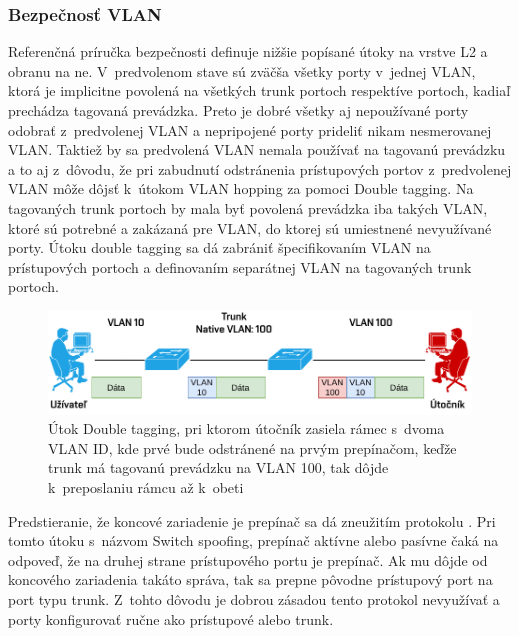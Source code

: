\subsubsection{Bezpečnosť VLAN}
Referenčná príručka bezpečnosti \cite{uYLsMtQInofenpV3} definuje nižšie popísané útoky na vrstve L2 a obranu na ne. V~predvolenom stave sú zväčša všetky porty v~jednej VLAN, ktorá je implicitne povolená na všetkých trunk portoch respektíve portoch, kadiaľ prechádza tagovaná prevádzka. Preto je dobré všetky aj nepoužívané porty odobrať z~predvolenej VLAN a nepripojené porty prideliť nikam nesmerovanej VLAN. Taktiež by sa predvolená VLAN nemala používať na tagovanú prevádzku a to aj z~dôvodu, že pri zabudnutí odstránenia prístupových portov z~predvolenej VLAN môže dôjsť k~útokom VLAN hopping za pomoci Double tagging. Na tagovaných trunk portoch by mala byť povolená prevádzka iba takých VLAN, ktoré sú potrebné a zakázaná pre VLAN, do ktorej sú umiestnené nevyužívané porty. Útoku double tagging sa dá zabrániť špecifikovaním VLAN na prístupových portoch a definovaním separátnej VLAN na tagovaných trunk portoch.

\begin{figure}[H]
	\begin{center}
		\includegraphics[scale=0.75]{obrazky/double-tagging.pdf}
	\end{center}
	\caption[VLAN Hopping s~Double Tagging]{Útok Double tagging, pri ktorom útočník zasiela rámec s~dvoma VLAN ID, kde prvé bude odstránené na prvým prepínačom, keďže trunk má tagovanú prevádzku na VLAN 100, tak dôjde k~preposlaniu rámcu až k~obeti \cite{srOo9OPXJxHjPBgo}}
	\label{fig:double-tagging}
\end{figure} 

Predstieranie, že koncové zariadenie je prepínač sa dá zneužitím protokolu  \cite{uYLsMtQInofenpV3}. Pri tomto útoku s~názvom Switch spoofing, prepínač aktívne alebo pasívne čaká na odpoveď, že na druhej strane prístupového portu je prepínač. Ak mu dôjde od koncového zariadenia takáto správa, tak sa prepne pôvodne prístupový port na port typu trunk. Z~tohto dôvodu je dobrou zásadou tento protokol nevyužívať a porty konfigurovať ručne ako prístupové alebo trunk.

